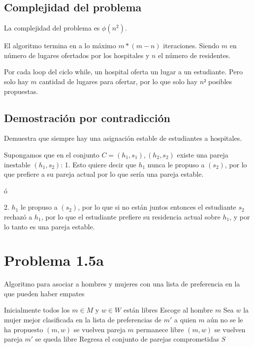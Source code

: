 \documentclass{article}
\begin{document}
\subsection*{Complejidad del problema}
La complejidad del problema es $\phi(n^2)$.

El algoritmo termina en a lo máximo $m*(m-n)$ iteraciones. Siendo $m$ en número de
lugares ofertados por los hospitales y $n$ el número de residentes.

Por cada loop del ciclo while, un hospital oferta un lugar a un estudiante. Pero
solo hay $m$ cantidad de lugares para ofertar, por lo que solo hay $n²$ posibles
propuestas.

\subsection*{Demostración por contradicción}

Demuestra que siempre hay una asignación estable de estudiantes a hospitales.

Supongamos que en el conjunto $C = {(h_1,s_1),(h_2,s_2)}$ existe una pareja
inestable $(h_1,s_2)$:
1. Esto quiere decir que $h_1$ nunca le propuso a $(s_2)$, por lo que prefiere a
su pareja actual por lo que sería una pareja estable.

ó 

2. $h_1$ le propuso a $(s_2)$, por lo que si no están juntos entonces el
estudiante $s_2$ rechazó a $h_1$, por lo que el estudiante prefiere su
residencia actual sobre $h_1$, y por lo tanto es una pareja estable.


\section*{Problema 1.5a}

\begin{algorithm}
\caption{Algoritmo para asociar a hombres y mujeres con una lista de preferencia
en la que pueden haber empates}\label{alg:cap}
    \begin{algorithmic}
    \Require Inicialmente todos los $m \in M$ y $w \in W$ están libres
        \State Escoge al hombre $m$
        \State Sea $w$ la mujer mejor clasificada en la lista de preferencias de $m'$ a
        quien $m$ aún no se le ha propuesto
            \State $(m,w)$ se vuelven pareja
                \State $m$ permanece libre
                \State $(m,w)$ se vuelven pareja
                \State $m'$ se queda libre
            \EndIf
        \EndIf
    \EndWhile
    \State Regresa el conjunto de parejas comprometidas $S$
    \end{algorithmic}
\end{algorithm}
\end{document}
